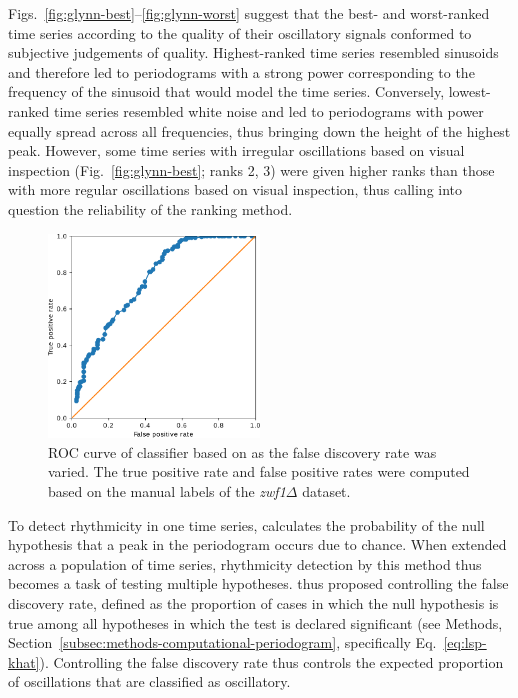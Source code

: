 Figs.\ \ref{fig:glynn-best}--\ref{fig:glynn-worst} suggest that the best- and worst-ranked time series according to the quality of their oscillatory signals conformed to subjective judgements of quality.
Highest-ranked time series resembled sinusoids and therefore led to periodograms with a strong power corresponding to the frequency of the sinusoid that would model the time series.
Conversely, lowest-ranked time series resembled white noise and led to periodograms with power equally spread across all frequencies, thus bringing down the height of the highest peak.
However, some time series with irregular oscillations based on visual inspection (Fig.\ \ref{fig:glynn-best}; ranks 2, 3) were given higher ranks than those with more regular oscillations based on visual inspection, thus calling into question the reliability of the ranking method.

\begin{figure}
  \centering
  \includegraphics[width=0.5\textwidth]{glynn_is20016_5_edit.pdf}
  \caption[
    ROC curve of classifier based on \textcite{glynnDetectingPeriodicPatterns2006}.
  ]{
    ROC curve of classifier based on \textcite{glynnDetectingPeriodicPatterns2006} as the false discovery rate was varied.
    The true positive rate and false positive rates were computed based on the manual labels of the \textit{zwf1$\Delta$} dataset.
  }
  \label{fig:glynn-roc}
\end{figure}

To detect rhythmicity in one time series, \textcite{glynnDetectingPeriodicPatterns2006} calculates the probability of the null hypothesis that a peak in the periodogram occurs due to chance.
When extended across a population of time series, rhythmicity detection by this method thus becomes a task of testing multiple hypotheses.
\textcite{glynnDetectingPeriodicPatterns2006} thus proposed controlling the false discovery rate, defined as the proportion of cases in which the null hypothesis is true among all hypotheses in which the test is declared significant (see Methods, Section~\ref{subsec:methods-computational-periodogram}, specifically Eq.\ \ref{eq:lsp-khat}).
Controlling the false discovery rate thus controls the expected proportion of oscillations that are classified as oscillatory.

